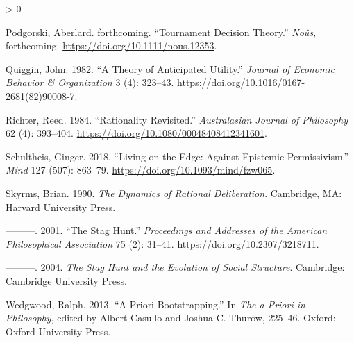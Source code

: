 \documentclass[
  12pt,
]{article}
\newlength{\cslhangindent}
\newenvironment{CSLReferences}[2] %
 {%
  \setlength{\parindent}{0pt}
  \ifodd #1 \everypar{\setlength{\hangindent}{\cslhangindent}}\ignorespaces\fi
  \ifnum #2 > 0
  \setlength{\parskip}{#2\baselineskip}
  \fi
 }%
 {}
\begin{document}
\begin{CSLReferences}{1}{0}
\leavevmode\hypertarget{ref-Podgorski2022}{}%
Podgorski, Aberlard. forthcoming. {``Tournament Decision Theory.''}
\emph{No{û}s}, forthcoming. \url{https://doi.org/10.1111/nous.12353}.

\leavevmode\hypertarget{ref-Quiggin1982}{}%
Quiggin, John. 1982. {``A Theory of Anticipated Utility.''}
\emph{Journal of Economic Behavior \& Organization} 3 (4): 323--43.
\url{https://doi.org/10.1016/0167-2681(82)90008-7}.

\leavevmode\hypertarget{ref-Richter1984}{}%
Richter, Reed. 1984. {``Rationality Revisited.''} \emph{Australasian
Journal of Philosophy} 62 (4): 393--404.
\url{https://doi.org/10.1080/00048408412341601}.

\leavevmode\hypertarget{ref-Schultheis2018}{}%
Schultheis, Ginger. 2018. {``Living on the Edge: Against Epistemic
Permissivism.''} \emph{Mind} 127 (507): 863--79.
\url{https://doi.org/10.1093/mind/fzw065}.

\leavevmode\hypertarget{ref-Skyrms1990}{}%
Skyrms, Brian. 1990. \emph{The Dynamics of Rational Deliberation}.
Cambridge, MA: Harvard University Press.

\leavevmode\hypertarget{ref-Skyrms2001}{}%
---------. 2001. {``The Stag Hunt.''} \emph{Proceedings and Addresses of
the American Philosophical Association} 75 (2): 31--41.
\url{https://doi.org/10.2307/3218711}.

\leavevmode\hypertarget{ref-Skyrms2004}{}%
---------. 2004. \emph{The Stag Hunt and the Evolution of Social
Structure}. Cambridge: {C}ambridge {U}niversity {P}ress.

\leavevmode\hypertarget{ref-Wedgwood2013}{}%
Wedgwood, Ralph. 2013. {``A Priori Bootstrapping.''} In \emph{The a
Priori in Philosophy}, edited by Albert Casullo and Joshua C. Thurow,
225--46. Oxford: Oxford University Press.

\end{CSLReferences}
\end{document}
